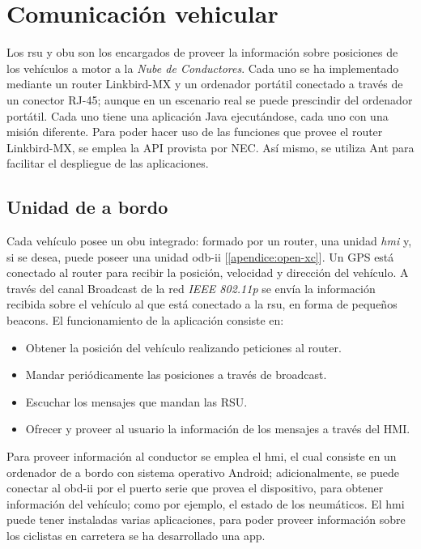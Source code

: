 \section{Comunicación vehicular}\label{section:comunicacion_vehicular}
Los \gls{rsu} y \gls{obu} son los encargados de proveer la información sobre posiciones de los vehículos a motor a la \emph{Nube de Conductores}. Cada uno se ha implementado mediante un router Linkbird-MX y un ordenador portátil conectado a través de un conector RJ-45; aunque en un escenario real se puede prescindir del ordenador portátil. Cada uno tiene una aplicación Java ejecutándose, cada uno con una misión diferente. Para poder hacer uso de las funciones que provee el router Linkbird-MX, se emplea la API provista por NEC. Así mismo, se utiliza Ant para facilitar el despliegue de las aplicaciones.

\subsection{Unidad de a bordo}
Cada vehículo posee un \gls{obu} integrado: formado por un router, una unidad \emph{hmi} y, si se desea, puede poseer una unidad \Gls{odb-ii} [\ref{apendice:open-xc}]. Un GPS está conectado al router para recibir la posición, velocidad y dirección del vehículo. A través del canal Broadcast de la red \emph{IEEE 802.11p} se envía la información recibida sobre el vehículo al que está conectado a la \gls{rsu}, en forma de pequeños beacons. El funcionamiento de la aplicación consiste en:
\begin{itemize}
	\item Obtener la posición del vehículo realizando peticiones al router.
	\item Mandar periódicamente las posiciones a través de broadcast.
	\item Escuchar los mensajes que mandan las RSU.
	\item Ofrecer y proveer al usuario la información de los mensajes a través del HMI.
\end{itemize}

Para proveer información al conductor se emplea el \gls{hmi}, el cual consiste en un ordenador de a bordo con sistema operativo Android; adicionalmente, se puede conectar al \Gls{obd-ii} por el puerto serie que provea el dispositivo, para obtener información del vehículo; como por ejemplo, el estado de los neumáticos. El \gls{hmi} puede tener instaladas varias aplicaciones, para poder proveer información sobre los ciclistas en carretera se ha desarrollado una app.

